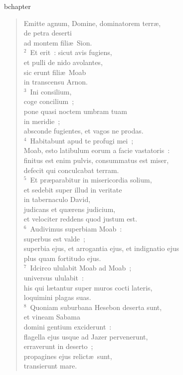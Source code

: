 bchapter\begin{verse}\vspace{-19pt}Emitte agnum, Domine, dominatorem terr\ae ,\\ de petra deserti\\ ad montem fili\ae\ Sion.\\
${}^{2}$~Et erit~: sicut avis fugiens,\\ et pulli de nido avolantes,\\ sic erunt fili\ae\ Moab\\ in transcensu Arnon.\\
${}^{3}$~Ini consilium,\\ coge concilium~;\\ pone quasi noctem umbram tuam\\ in meridie~;\\ absconde fugientes, et vagos ne prodas.\\
${}^{4}$~Habitabunt apud te profugi mei~;\\ Moab, esto latibulum eorum a facie vastatoris~:\\ finitus est enim pulvis, consummatus est miser,\\ defecit qui conculcabat terram.\\
${}^{5}$~Et pr\ae parabitur in misericordia solium,\\ et sedebit super illud in veritate\\ in tabernaculo David,\\ judicans et qu\ae rens judicium,\\ et velociter reddens quod justum est.\\
${}^{6}$~Audivimus superbiam Moab~:\\ superbus est valde~;\\ superbia ejus, et arrogantia ejus, et indignatio ejus\\ plus quam fortitudo ejus.\\
${}^{7}$~Idcirco ululabit Moab ad Moab~;\\ universus ululabit~:\\ his qui l\ae tantur super muros cocti lateris,\\ loquimini plagas suas.\\
${}^{8}$~Quoniam suburbana Hesebon deserta sunt,\\ et vineam Sabama\\ domini gentium exciderunt~:\\ flagella ejus usque ad Jazer pervenerunt,\\ erraverunt in deserto~;\\ propagines ejus relict\ae\ sunt,\\ transierunt mare.\\

\end{verse}
